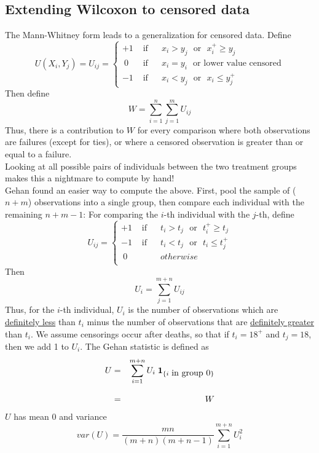 \documentclass[11pt,slidesonly,semrot,portrait,palatino]{book}
\begin{document}
{\subsection{Extending Wilcoxon to censored data}
The Mann-Whitney form leads to a generalization
for censored data.  Define
\[U(X_i,Y_j)=U_{ij}=\left\{\begin{array}{ccl}
+1 & \mbox{ if } & ~~x_i>y_j \mbox{~~or~~} x_i^+\geq y_j\\
~0 & \mbox{ if } & ~~x_i=y_i \mbox{~~or lower value censored}\\
-1 & \mbox{ if } & ~~x_i<y_j \mbox{~~or~~} x_i \leq y_j^+
\end{array} \right. \]
Then define $$W=\sum_{i=1}^{n} \sum_{j=1}^{m} U_{ij}$$
Thus, there is a contribution to $W$ for every comparison
where both observations are failures (except for ties), or
where a censored observation is greater than or equal to a failure.
\\[2ex]
Looking at all possible pairs of individuals between the
two treatment groups makes this a nightmare to compute by
hand!
\\[2ex]
Gehan found an easier way to compute the above.  First, pool
the sample of ($n+m$) observations into a single group, then
compare each individual with the remaining $n+m-1$:  For
comparing the $i$-th individual with the $j$-th, define
\[ U_{ij}=\left\{\begin{array}{ccc}
+1 & \mbox{ if } & ~~t_i>t_j \mbox{~~or~~} t_i^+\geq t_j\\
-1 & \mbox{ if } & ~~t_i<t_j \mbox{~~or~~} t_i \leq t_j^+\\
~0 &             & ~~otherwise\\
\end{array} \right. \]
Then
$$U_i=\sum_{j=1}^{m+n} U_{ij}$$
Thus, for the $i$-th individual, $U_i$ is the number of
observations which are \underline{definitely less} than $t_i$
minus the number of observations that are \underline{definitely
greater} than $t_i$.  We assume censorings occur after deaths,
so that if $t_i=18^+$ and $t_j=18$, then we add 1 to $U_i$.
The Gehan statistic is defined as
\begin{eqnarray*}
U & = & \sum_{i=1}^{m+n} U_i \; {\bf 1}_{\{i \mbox{ in group 0}\}}\\[2ex]
  & = & W
\end{eqnarray*}
$U$ has mean 0 and variance
\[var(U) = \frac{mn}{(m+n)(m+n-1)}\sum_{i=1}^{m+n} U_i^2\]
}
\end{document}
